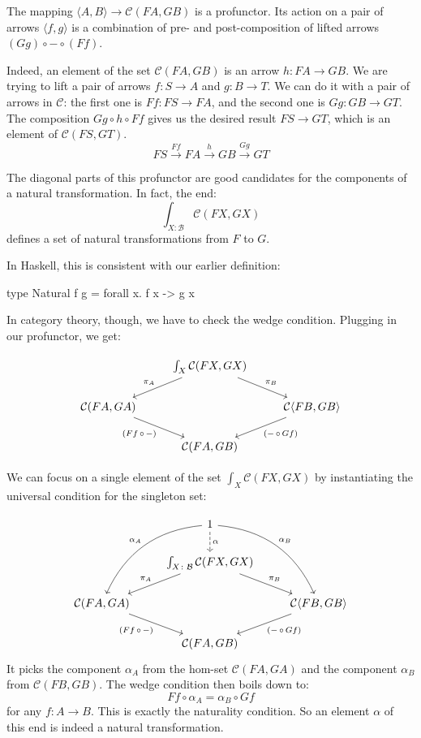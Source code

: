 \documentclass[DaoFP]{subfiles}
\begin{document}
The mapping  $\langle A, B \rangle \to \mathcal{C} (F A, G B)$ is a profunctor. Its action on a pair of arrows $\langle f, g \rangle$ is a combination of pre- and post-composition of lifted arrows $(G g) \circ - \circ (F f)$. 

Indeed, an element of the set $ \mathcal{C} (F A, G B)$ is an arrow $h \colon F A \to G B$. We are trying to lift a pair of arrows $f \colon S \to A$ and $g \colon B \to T$. We can do it with a pair of arrows in $\mathcal{C}$: the first one is $F f \colon F S \to F A$, and the second one is $G g \colon G B \to G T$. The composition $G g \circ h \circ F f$ gives us the desired result $ F S \to G T$, which is an element of $\mathcal{C} (F S, G T)$.
\[ F S \xrightarrow{F f} F A \xrightarrow{h} G B \xrightarrow{G g} GT \]

The diagonal parts of this profunctor are good candidates for the components of a natural transformation. In fact, the end:
\[  \int_{X \colon  \mathcal{B}} \mathcal{C}(FX, GX) \]
defines a set of natural transformations from $F$ to $G$.

In Haskell, this is consistent with our earlier definition:
\begin{haskell}
type Natural f g = forall x. f x -> g x
\end{haskell}

In category theory, though, we have to check the wedge condition. Plugging in our profunctor, we get:

\[
 \begin{tikzcd}
 & \int_{X} \mathcal{C}(FX, GX)
 \arrow[ld, "\pi_A"']
 \arrow[rd, "\pi_B"]
 \\
  \mathcal{C} ( FA, GA )
 \arrow[dr, "{(Ff \, \circ \, -)}"']
 && \mathcal{C} \langle FB, GB \rangle
 \arrow[dl, "{(- \, \circ\, Gf)}"]
 \\
 &  \mathcal{C} ( FA, GB )
 \end{tikzcd}
\]

We can focus on a single element of the set $\int_{X} \mathcal{C}(FX, GX)$ by instantiating the universal condition for the singleton set:

\[
 \begin{tikzcd}
 & 1
 \arrow[d, dashed, "\alpha"]
\arrow[ddl, bend right, "\alpha_A"']
 \arrow[ddr, bend left, "\alpha_B"]
 \\
 & \int_{X \colon  \mathcal{B}} \mathcal{C}(FX, GX)
 \arrow[ld, "\pi_A"']
 \arrow[rd, "\pi_B"]
 \\
  \mathcal{C} ( FA, GA )
 \arrow[dr, "{(Ff \, \circ \, -)}"']
 && \mathcal{C} \langle FB, GB \rangle
 \arrow[dl, "{(- \, \circ\, Gf)}"]
 \\
 &  \mathcal{C} ( FA, GB )
 \end{tikzcd}
\]
It picks the component $\alpha_A$ from the hom-set $\mathcal{C} ( FA, GA )$ and the component $\alpha_B$ from $\mathcal{C} ( FB, GB )$. The wedge condition then boils down to:
\[ F f \circ \alpha_A = \alpha_B \circ G f \]
for any $f \colon A \to B$. This is exactly the naturality condition. So an element $\alpha$ of this end is indeed a natural transformation.
\end{document}
